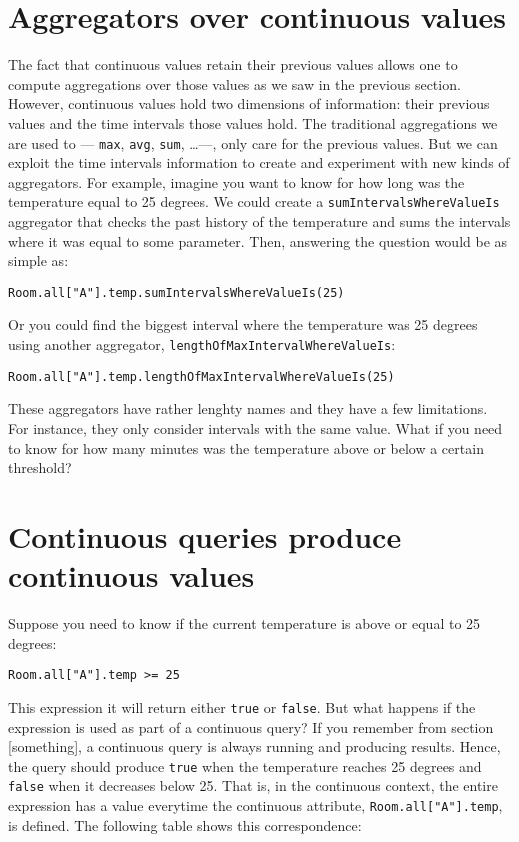 \documentclass{report}
\begin{document}
\section{Aggregators over continuous values}

The fact that continuous values retain their previous values allows
one to compute aggregations over those values as we saw in the
previous section. However, continuous values hold two dimensions of
information: their previous values and the time intervals those values
hold. The traditional aggregations we are used to --- \verb=max=,
\verb=avg=, \verb=sum=, \ldots ---, only care for the previous
values. But we can exploit the time intervals information to create
and experiment with new kinds of aggregators. For example, imagine you
want to know for how long was the temperature equal to 25 degrees. We
could create a \verb=sumIntervalsWhereValueIs= aggregator that checks
the past history of the temperature and sums the intervals where it
was equal to some parameter. Then, answering the question would be as
simple as:

\begin{verbatim}
Room.all["A"].temp.sumIntervalsWhereValueIs(25)
\end{verbatim}

Or you could find the biggest interval where the temperature was 25
degrees using another aggregator,
\verb=lengthOfMaxIntervalWhereValueIs=:

\begin{verbatim}
Room.all["A"].temp.lengthOfMaxIntervalWhereValueIs(25)
\end{verbatim}

These aggregators have rather lenghty names and they have a few
limitations. For instance, they only consider intervals with the same
value. What if you need to know for how many minutes was the
temperature above or below a certain threshold?

\section{Continuous queries produce continuous values}

Suppose you need to know if the current temperature is above or equal
to 25 degrees:

\begin{verbatim}
Room.all["A"].temp >= 25
\end{verbatim}

This expression it will return either \verb=true= or \verb=false=. But
what happens if the expression is used as part of a continuous query?
If you remember from section [something], a continuous query is always
running and producing results. Hence, the query should produce
\verb=true= when the temperature reaches 25 degrees and \verb=false=
when it decreases below 25. That is, in the continuous context, the
entire expression has a value everytime the continuous attribute,
\verb=Room.all["A"].temp=, is defined. The following table shows this
correspondence:
\end{document}
